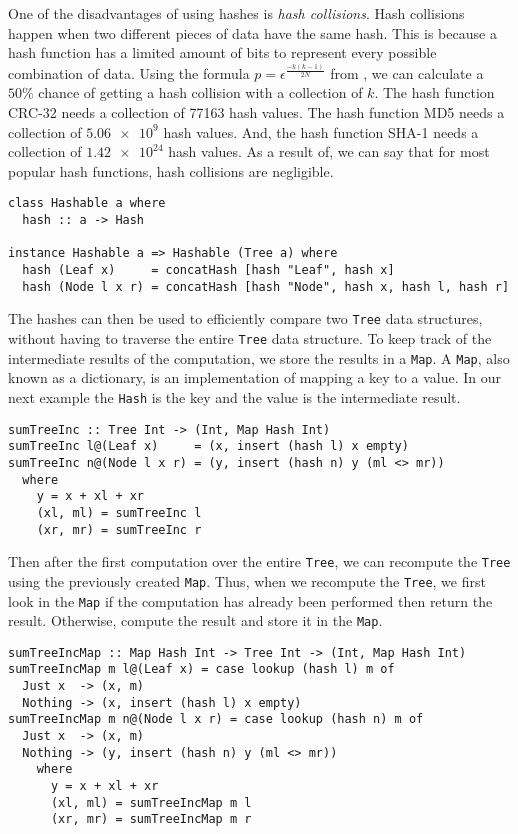 One of the disadvantages of using hashes is \textit{hash collisions}. Hash collisions happen when two different pieces of data have the same hash. This is because a hash function has a limited amount of bits to represent every possible combination of data. Using the formula $p = \epsilon^{\frac{-k(k-1)}{2N}}$ from \cite{hashcoll2011}, we can calculate a $50\%$ chance of getting a hash collision with a collection of $k$. The hash function CRC-32 needs a collection of 77163 hash values. The hash function MD5 needs a collection of $\num{5.06e9}$ hash values. And, the hash function SHA-1 needs a collection of $\num{1.42e24}$ hash values. As a result of, we can say that for most popular hash functions, hash collisions are negligible.

\begin{verbatim}
class Hashable a where
  hash :: a -> Hash

instance Hashable a => Hashable (Tree a) where
  hash (Leaf x)     = concatHash [hash "Leaf", hash x]
  hash (Node l x r) = concatHash [hash "Node", hash x, hash l, hash r]
\end{verbatim}

The hashes can then be used to efficiently compare two \texttt{Tree} data structures, without having to traverse the entire \texttt{Tree} data structure. To keep track of the intermediate results of the computation, we store the results in a \texttt{Map}. A \texttt{Map}, also known as a dictionary, is an implementation of mapping a key to a value. In our next example the \texttt{Hash} is the key and the value is the intermediate result.

\begin{verbatim}
sumTreeInc :: Tree Int -> (Int, Map Hash Int)
sumTreeInc l@(Leaf x)     = (x, insert (hash l) x empty)
sumTreeInc n@(Node l x r) = (y, insert (hash n) y (ml <> mr))
  where
    y = x + xl + xr
    (xl, ml) = sumTreeInc l
    (xr, mr) = sumTreeInc r
\end{verbatim}

Then after the first computation over the entire \texttt{Tree}, we can recompute the \texttt{Tree} using the previously created \texttt{Map}. Thus, when we recompute the \texttt{Tree}, we first look in the \texttt{Map} if the computation has already been performed then return the result. Otherwise, compute the result and store it in the \texttt{Map}.

\begin{verbatim}
sumTreeIncMap :: Map Hash Int -> Tree Int -> (Int, Map Hash Int)
sumTreeIncMap m l@(Leaf x) = case lookup (hash l) m of
  Just x  -> (x, m) 
  Nothing -> (x, insert (hash l) x empty)
sumTreeIncMap m n@(Node l x r) = case lookup (hash n) m of
  Just x  -> (x, m)
  Nothing -> (y, insert (hash n) y (ml <> mr))
    where
      y = x + xl + xr
      (xl, ml) = sumTreeIncMap m l
      (xr, mr) = sumTreeIncMap m r
\end{verbatim}

